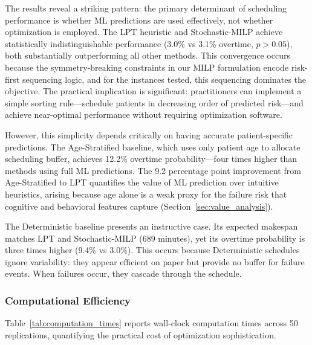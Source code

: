 \documentclass[11pt,a4paper]{article}
\begin{document}
The results reveal a striking pattern: the primary determinant of scheduling performance is whether ML predictions are used effectively, not whether optimization is employed. The LPT heuristic and Stochastic-MILP achieve statistically indistinguishable performance (3.0\% vs 3.1\% overtime, $p > 0.05$), both substantially outperforming all other methods. This convergence occurs because the symmetry-breaking constraints in our MILP formulation encode risk-first sequencing logic, and for the instances tested, this sequencing dominates the objective. The practical implication is significant: practitioners can implement a simple sorting rule---schedule patients in decreasing order of predicted risk---and achieve near-optimal performance without requiring optimization software.

However, this simplicity depends critically on having accurate patient-specific predictions. The Age-Stratified baseline, which uses only patient age to allocate scheduling buffer, achieves 12.2\% overtime probability---four times higher than methods using full ML predictions. The 9.2 percentage point improvement from Age-Stratified to LPT quantifies the value of ML prediction over intuitive heuristics, arising because age alone is a weak proxy for the failure risk that cognitive and behavioral features capture (Section~\ref{sec:value_analysis}).

The Deterministic baseline presents an instructive case. Its expected makespan matches LPT and Stochastic-MILP (689 minutes), yet its overtime probability is three times higher (9.4\% vs 3.0\%). This occurs because Deterministic schedules ignore variability: they appear efficient on paper but provide no buffer for failure events. When failures occur, they cascade through the schedule.

\subsubsection{Computational Efficiency}

Table~\ref{tab:computation_times} reports wall-clock computation times across 50 replications, quantifying the practical cost of optimization sophistication.

\end{document}
